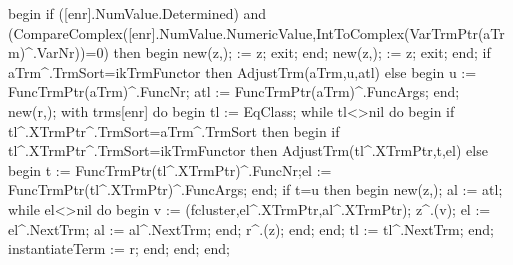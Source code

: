       begin
         if ([enr].NumValue.Determined) and
               (CompareComplex([enr].NumValue.NumericValue,IntToComplex(VarTrmPtr(aTrm)^.VarNr))=0) then
         begin
            new(z,);
             := z;
            exit;
         end;
         new(z,);
          := z;
         exit;
      end;
      if aTrm^.TrmSort=ikTrmFunctor then AdjustTrm(aTrm,u,atl)
      else
      begin
         u := FuncTrmPtr(aTrm)^.FuncNr;
         atl := FuncTrmPtr(aTrm)^.FuncArgs;
      end;
      new(r,);
      with trms[enr] do
      begin
         tl := EqClass;
         while tl<>nil do
         begin
            if tl^.XTrmPtr^.TrmSort=aTrm^.TrmSort then
            begin
               if tl^.XTrmPtr^.TrmSort=ikTrmFunctor then AdjustTrm(tl^.XTrmPtr,t,el)
               else
               begin t := FuncTrmPtr(tl^.XTrmPtr)^.FuncNr;el := FuncTrmPtr(tl^.XTrmPtr)^.FuncArgs;
               end;
               if t=u then
               begin
                  new(z,);
                  al := atl;
                  while el<>nil do
                  begin
                     v := (fcluster,el^.XTrmPtr,al^.XTrmPtr);
                     z^.(v);
                     el := el^.NextTrm;
                     al := al^.NextTrm;
                  end;
                  r^.(z);
               end;
            end;
            tl := tl^.NextTrm;
         end;
         instantiateTerm := r;
      end;
   end;
end;

